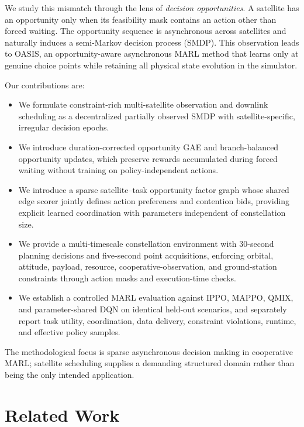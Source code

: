 \documentclass[letterpaper]{article}
\begin{document}
We study this mismatch through the lens of \emph{decision opportunities}.  A satellite has an opportunity only when its feasibility mask contains an action other than forced waiting.  The opportunity sequence is asynchronous across satellites and naturally induces a semi-Markov decision process (SMDP).  This observation leads to OASIS, an opportunity-aware asynchronous MARL method that learns only at genuine choice points while retaining all physical state evolution in the simulator.

Our contributions are:
\begin{itemize}
    \item We formulate constraint-rich multi-satellite observation and downlink scheduling as a decentralized partially observed SMDP with satellite-specific, irregular decision epochs.
    \item We introduce duration-corrected opportunity GAE and branch-balanced opportunity updates, which preserve rewards accumulated during forced waiting without training on policy-independent actions.
    \item We introduce a sparse satellite--task opportunity factor graph whose shared edge scorer jointly defines action preferences and contention bids, providing explicit learned coordination with parameters independent of constellation size.
    \item We provide a multi-timescale constellation environment with 30-second planning decisions and five-second point acquisitions, enforcing orbital, attitude, payload, resource, cooperative-observation, and ground-station constraints through action masks and execution-time checks.
    \item We establish a controlled MARL evaluation against IPPO, MAPPO, QMIX, and parameter-shared DQN on identical held-out scenarios, and separately report task utility, coordination, data delivery, constraint violations, runtime, and effective policy samples.
\end{itemize}

The methodological focus is sparse asynchronous decision making in cooperative MARL; satellite scheduling supplies a demanding structured domain rather than being the only intended application.

\section{Related Work}
\end{document}
